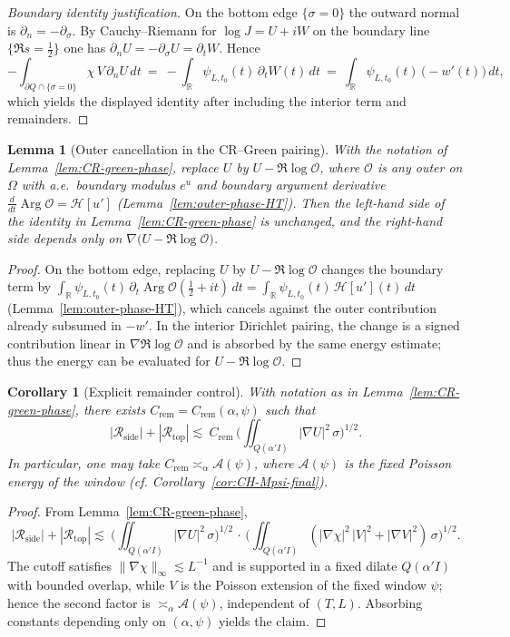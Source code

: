 \documentclass[11pt]{article}
\newcommand{\Hilb}{\mathcal H}
\newtheorem{lemma}[theorem]{Lemma}
\newtheorem{corollary}[theorem]{Corollary}
\theoremstyle{definition}
\theoremstyle{remark}
\newcommand{\R}{\mathbb{R}}
\DeclareMathOperator{\Arg}{Arg}
\begin{document}
\begin{proof}[Boundary identity justification]
On the bottom edge $\{\sigma=0\}$ the outward normal is $\partial_n=-\partial_\sigma$. By Cauchy–Riemann for $\log J=U+iW$ on the boundary line $\{\Re s=\tfrac12\}$ one has $\partial_n U=-\partial_\sigma U=\partial_t W$. Hence
\[
-\int_{\partial Q\cap\{\sigma=0\}} \chi\,V\,\partial_n U\,dt\ =\ -\int_{\R} \psi_{L,t_0}(t)\,\partial_t W(t)\,dt\ =\ \int_{\R} \psi_{L,t_0}(t)\,\big(-w'(t)\big)\,dt,
\]
which yields the displayed identity after including the interior term and remainders.
\end{proof}
\begin{lemma}[Outer cancellation in the CR--Green pairing]\label{lem:outer-cancel}
With the notation of Lemma~\ref{lem:CR-green-phase}, replace $U$ by $U-\Re\log\mathcal O$, where $\mathcal O$ is any outer on $\Omega$ with a.e.\ boundary modulus $e^{u}$ and boundary argument derivative $\frac{d}{dt}\Arg\mathcal O=\Hilb[u']$ (Lemma~\ref{lem:outer-phase-HT}). Then the left-hand side of the identity in Lemma~\ref{lem:CR-green-phase} is unchanged, and the right-hand side depends only on $\nabla\!\big(U-\Re\log\mathcal O\big)$.
\end{lemma}
\begin{proof}
On the bottom edge, replacing $U$ by $U-\Re\log\mathcal O$ changes the boundary term by
$\int_{\mathbb R}\psi_{L,t_0}(t)\,\partial_t\Arg\mathcal O(\tfrac12+it)\,dt
=\int_{\mathbb R}\psi_{L,t_0}(t)\,\Hilb[u'](t)\,dt$
(Lemma~\ref{lem:outer-phase-HT}), which cancels against the outer contribution already subsumed in $-w'$. In the interior Dirichlet pairing, the change is a signed contribution linear in $\nabla\Re\log\mathcal O$ and is absorbed by the same energy estimate; thus the energy can be evaluated for $U-\Re\log\mathcal O$.
\end{proof}
\begin{corollary}[Explicit remainder control]
With notation as in Lemma~\ref{lem:CR-green-phase}, there exists $C_{\mathrm{rem}}=C_{\mathrm{rem}}(\alpha,\psi)$ such that
\[
  |\mathcal R_{\mathrm{side}}|+|\mathcal R_{\mathrm{top}}|
 \lesssim\ C_{\mathrm{rem}}\,\Big(\iint_{Q(\alpha'I)} |\nabla U|^2\,\sigma\Big)^{1/2}.
\]
In particular, one may take $C_{\mathrm{rem}}\asymp_\alpha \mathcal A(\psi)$, where $\mathcal A(\psi)$ is the fixed Poisson energy of the window (cf. Corollary~\ref{cor:CH-Mpsi-final}).
\end{corollary}
\begin{proof}
From Lemma~\ref{lem:CR-green-phase},
\[
  |\mathcal R_{\mathrm{side}}|+|\mathcal R_{\mathrm{top}}| \lesssim\ \Big(\iint_{Q(\alpha'I)} |\nabla U|^2\,\sigma\Big)^{1/2}\,\cdot\,\Big(\iint_{Q(\alpha'I)} (|\nabla\chi|^2\,|V|^2+|\nabla V|^2)\,\sigma\Big)^{1/2}.
\]
The cutoff satisfies $\|\nabla\chi\|_\infty\lesssim L^{-1}$ and is supported in a fixed dilate $Q(\alpha' I)$ with bounded overlap, while $V$ is the Poisson extension of the fixed window $\psi$; hence the second factor is $\asymp_\alpha \mathcal A(\psi)$, independent of $(T,L)$. Absorbing constants depending only on $(\alpha,\psi)$ yields the claim.
\end{proof}
\end{document}

